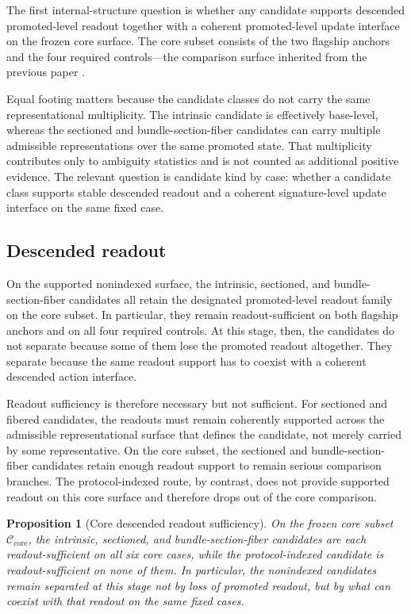 \documentclass[11pt]{article}
\newtheorem{proposition}[theorem]{Proposition}
\theoremstyle{definition}
\begin{document}
The first internal-structure question is whether any candidate supports descended promoted-level readout together with a coherent promoted-level update interface on the frozen core surface. The core subset consists of the two flagship anchors and the four required controls---the comparison surface inherited from the previous paper \cite{Tsiokos2026PromotionCriteria}.

Equal footing matters because the candidate classes do not carry the same representational multiplicity. The intrinsic candidate is effectively base-level, whereas the sectioned and bundle-section-fiber candidates can carry multiple admissible representations over the same promoted state. That multiplicity contributes only to ambiguity statistics and is not counted as additional positive evidence. The relevant question is candidate kind by case: whether a candidate class supports stable descended readout and a coherent signature-level update interface on the same fixed case.

\subsection{Descended readout}

On the supported nonindexed surface, the intrinsic, sectioned, and bundle-section-fiber candidates all retain the designated promoted-level readout family on the core subset. In particular, they remain readout-sufficient on both flagship anchors and on all four required controls. At this stage, then, the candidates do not separate because some of them lose the promoted readout altogether. They separate because the same readout support has to coexist with a coherent descended action interface.

Readout sufficiency is therefore necessary but not sufficient. For sectioned and fibered candidates, the readouts must remain coherently supported across the admissible representational surface that defines the candidate, not merely carried by some representative. On the core subset, the sectioned and bundle-section-fiber candidates retain enough readout support to remain serious comparison branches. The protocol-indexed route, by contrast, does not provide supported readout on this core surface and therefore drops out of the core comparison.

\begin{proposition}[Core descended readout sufficiency]
\label{prop:descended-readout-core}
On the frozen core subset $\mathcal C_{\mathrm{core}}$, the intrinsic, sectioned, and bundle-section-fiber candidates are each readout-sufficient on all six core cases, while the protocol-indexed candidate is readout-sufficient on none of them. In particular, the nonindexed candidates remain separated at this stage not by loss of promoted readout, but by what can coexist with that readout on the same fixed cases.
\end{proposition}
\end{document}
